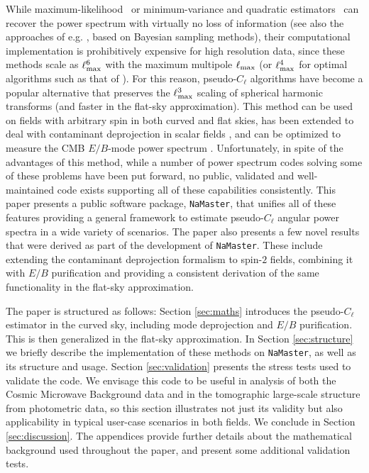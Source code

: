 \documentclass[usenatbib]{mnrasb}
\newcommand{\nmt}{{\tt NaMaster}}
\begin{document}
    While maximum-likelihood~\citep{1998PhRvD..57.2117B,2003PhRvD..67b3001W} or minimum-variance and quadratic estimators~\citep{1997PhRvD..55.5895T,2000MNRAS.317L..23H,2001PhRvD..64f3001T} can recover the power spectrum with virtually no loss of information (see also the approaches of e.g. \cite{2004ApJS..155..227E,2008MNRAS.389.1284T,2016MNRAS.455.4452A}, based on Bayesian sampling methods), their computational implementation is prohibitively expensive for high resolution data, since these methods scale as $\ell_{\rm max}^6$ with the maximum multipole $\ell_{\rm max}$ (or $\ell_{\rm max}^4$ for optimal algorithms such as that of \cite{2003PhRvD..67b3001W}). For this reason, pseudo-$C_\ell$ algorithms \citep{1973ApJ...185..413P,2001PhRvD..64h3003W,2001ApJ...561L..11S,2001PhRvD..64h3003W,2002ApJ...567....2H,2002MNRAS.336.1304H,2004MNRAS.350..914C} have become a popular alternative that preserves the $\ell_{\rm max}^3$ scaling of spherical harmonic transforms (and faster in the flat-sky approximation). This method can be used on fields with arbitrary spin \citep{2003ApJS..148..161K} in both curved and flat skies, has been extended to deal with contaminant deprojection in scalar fields \citep{2017MNRAS.465.1847E}, and can be optimized to measure the CMB $E/B$-mode power spectrum \citep{2002PhRvD..65b3505L,2003PhRvD..67b3501B,2006PhRvD..74h3002S,2009PhRvD..79l3515G,2011PhRvD..83h3003B}. Unfortunately, in spite of the advantages of this method, while a number of power spectrum codes solving some of these problems have been put forward, no public, validated and well-maintained code exists supporting all of these capabilities consistently. This paper presents a public software package, \nmt, that unifies all of these features providing a general framework to estimate pseudo-$C_\ell$ angular power spectra in a wide variety of scenarios. The paper also presents a few novel results that were derived as part of the development of \nmt. These include extending the contaminant deprojection formalism to spin-$2$ fields, combining it with $E/B$ purification and providing a consistent derivation of the same functionality in the flat-sky approximation.
    
    The paper is structured as follows: Section \ref{sec:maths} introduces the pseudo-$C_\ell$ estimator in the curved sky, including mode deprojection and $E/B$ purification. This is then generalized in the flat-sky approximation. In Section \ref{sec:structure} we briefly describe the implementation of these methods on \nmt, as well as its structure and usage. Section \ref{sec:validation} presents the stress tests used to validate the code. We envisage this code to be useful in analysis of both the Cosmic Microwave Background data and in the tomographic large-scale structure from photometric data, so this section illustrates not just its validity but also applicability in typical user-case scenarios in both fields. We conclude in Section \ref{sec:discussion}. The appendices provide further details about the mathematical background used throughout the paper, and present some additional validation tests.
    
\end{document}
